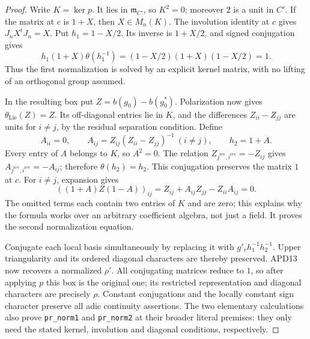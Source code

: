 \documentclass[11pt,a4paper]{article}
\numberwithin{equation}{section}
\theoremstyle{remark}\newtheorem{remark}[theorem]{Remark}
\begin{document}
\begin{proof}
Write \(K=\ker p\).  It lies in \(\mathfrak m_{C'}\), so
\(K^2=0\); moreover \(2\) is a unit in \(C'\).  If the
matrix at \(c\) is \(1+X\), then \(X\in M_n(K)\).
The involution identity at \(c\) gives
\(J_nX^tJ_n=X\).  Put \(h_1=1-X/2\).  Its inverse is
\(1+X/2\), and signed conjugation gives
\[
 h_1(1+X)\theta(h_1^{-1})
                 =(1-X/2)(1+X)(1-X/2)=1.                 \tag{APD.34}
\]
Thus the first normalization is solved by an explicit kernel
matrix, with no lifting of an orthogonal group assumed.

In the resulting box put \(Z=b(g_0)-b(g_0^*)\).  Polarization
now gives \(\theta_{\mathrm{Lie}}(Z)=Z\).  Its off-diagonal
entries lie in \(K\), and the differences \(Z_{ii}-Z_{jj}\)
are units for \(i\ne j\), by the residual separation condition.
Define
\[
 A_{ii}=0,\qquad A_{ij}=Z_{ij}(Z_{ii}-Z_{jj})^{-1}\ (i\ne j),
 \qquad h_2=1+A.                                         \tag{APD.35}
\]
Every entry of \(A\) belongs to \(K\), so \(A^2=0\).
The relation \(Z_{j^{\mathrm{rev}},i^{\mathrm{rev}}}=-Z_{ij}\)
gives \(A_{j^{\mathrm{rev}},i^{\mathrm{rev}}}=-A_{ij}\);
therefore \(\theta(h_2)=h_2\).  This conjugation preserves
the matrix \(1\) at \(c\).  For \(i\ne j\), expansion gives
\[
 ((1+A)Z(1-A))_{ij}
  =Z_{ij}+A_{ij}Z_{jj}-Z_{ii}A_{ij}=0.                    \tag{APD.36}
\]
The omitted terms each contain two entries of \(K\) and are
zero; this explains why the formula works over an arbitrary
coefficient algebra, not just a field.  It proves the second
normalization equation.

Conjugate each local basis simultaneously by replacing it with
\(g'_v h_1^{-1}h_2^{-1}\).  Upper triangularity and its
ordered diagonal characters are thereby preserved.  APD13 now
recovers a normalized \(\rho'\).  All conjugating matrices
reduce to \(1\), so after applying \(p\) this box is the
original one; its restricted representation and diagonal
characters are precisely \(\rho\).  Constant conjugations
and the locally constant sign character preserve all adic
continuity assertions.  The two elementary calculations also
prove \texttt{pr\_\allowbreak norm1} and \texttt{pr\_\allowbreak norm2} at their
broader literal premises: they only need the stated kernel,
involution and diagonal conditions, respectively.
\end{proof}

\end{document}
